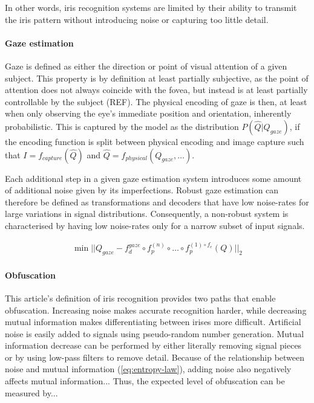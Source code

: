 In other words, iris recognition systems are limited by their ability to transmit the iris pattern without introducing noise or capturing too little detail.

\paragraph{Gaze estimation}
Gaze is defined as either the direction or point of visual attention of a given subject. This property is by definition at least partially subjective, as the point of attention does not always coincide with the fovea, but instead is at least partially controllable by the subject (REF). The physical encoding of gaze is then, at least when only observing the eye's immediate position and orientation, inherently probabilistic. This is captured by the model as the distribution $P(\hat{Q}|Q_{gaze})$, if the encoding function is split between physical encoding and image capture such that $I=f_{capture}(\hat{Q})$ and $\hat{Q}=f_{physical}(Q_{gaze}, \dots)$. 

Each additional step in a given gaze estimation system introduces some amount of additional noise given by its imperfections. Robust gaze estimation can therefore be defined as transformations and decoders that have low noise-rates for large variations in signal distributions. Consequently, a non-robust system is characterised by having low noise-rates only for a narrow subset of input signals. 



\begin{align}
    \min ||Q_{gaze} - f^{gaze}_d \circ f_p^{(n)} \circ \dots \circ f_p^{(1) \circ f_e}(Q)||_2
\end{align}


\paragraph{Obfuscation}
This article's definition of iris recognition provides two paths that enable obfuscation. Increasing noise makes accurate recognition harder, while decreasing mutual information makes differentiating between irises more difficult. Artificial noise is easily added to signals using pseudo-random number generation. Mutual information decrease can be performed by either literally removing signal pieces or by using low-pass filters to remove detail. Because of the relationship between noise and mutual information (\autoref{eq:entropy-law}), adding noise also negatively affects mutual information... Thus, the expected level of obfuscation can be measured by...



